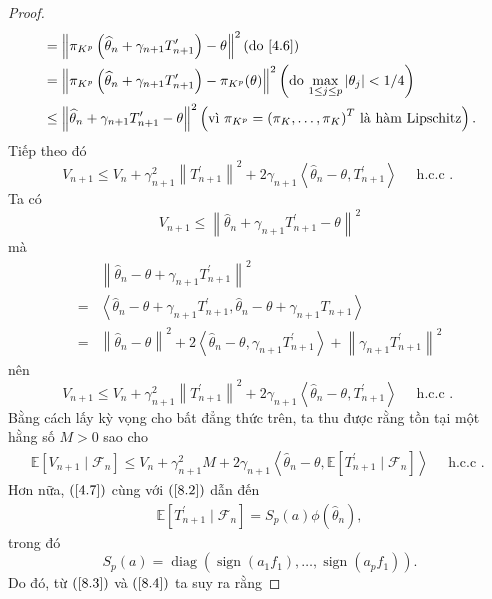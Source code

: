 \begin{proof}
$$\begin{aligned}
& =\left\|\pi_{K^{p}}\left(\widehat{\theta}_{n}+\gamma_{n+1} T_{n+1}^{\prime}\right)-\theta\right\|^{2} {\left(\text{do \ref{4.6}}\right)}\\
& =\left\|\pi_{K^{p}}\left(\widehat{\theta}_{n}+\gamma_{n+1} T_{n+1}^{\prime}\right)-\pi_{K^{p}}(\theta)\right\|^{2} {\left(\text{do $\max _{1 \leq j \leq p}\left|\theta_{j}\right|<1 / 4$}\right)}\\
& \leq\left\|\widehat{\theta}_{n}+\gamma_{n+1} T_{n+1}^{\prime}-\theta\right\|^{2} {\left(\text{vì $\pi_{K^{p}}=\left(\pi_{K}, \ldots, \pi_{K}\right)^{T}$ là hàm Lipschitz}\right).}
\end{aligned}
$$
Tiếp theo đó
$$
V_{n+1} \leq V_{n}+\gamma_{n+1}^{2}\left\|T_{n+1}^{\prime}\right\|^{2}+2 \gamma_{n+1}\left\langle\widehat{\theta}_{n}-\theta, T_{n+1}^{\prime}\right\rangle\quad \text { h.c.c . }
$$
Ta có
$$
V_{n+1} \leq\left\|\widehat{\theta}_{n}+\gamma_{n+1} T_{n+1}^{\prime}-\theta\right\|^{2}
$$
mà 
$$
\begin{aligned}
      &\left\|\hat{\theta}_n-\theta + \gamma_{n+1} T_{n+1}^{\prime}\right\|^2 \\
    = &\left\langle\hat{\theta}_n-\theta+\gamma_{n+1} T_{n+1}^{\prime}, \hat{\theta}_n-\theta+\gamma_{n+1} T_{n+1}\right\rangle \\
    = &\left\|\hat{\theta}_n-\theta\right\|^2+2\left\langle\hat{\theta}_n-\theta, \gamma_{n+1} T_{n+1}^{\prime}\right\rangle +\left\|\gamma_{n+1} T_{n+1}^{\prime}\right\|^2
\end{aligned}
$$
nên 
$$
V_{n+1} \leq V_{n}+\gamma_{n+1}^{2}\left\|T_{n+1}^{\prime}\right\|^{2}+2 \gamma_{n+1}\left\langle\widehat{\theta}_{n}-\theta, T_{n+1}^{\prime}\right\rangle\quad \text { h.c.c . }
$$
Bằng cách lấy kỳ vọng cho bất đẳng thức trên, ta thu được rằng tồn tại một hằng số $M>0$ sao cho
\begin{align}
    \mathbb{E}\left[V_{n+1} \mid \mathcal{F}_{n}\right] \leq V_{n}+\gamma_{n+1}^{2} M+2 \gamma_{n+1}\left\langle\widehat{\theta}_{n}-\theta, \mathbb{E}\left[T_{n+1}^{\prime} \mid \mathcal{F}_{n}\right]\right\rangle\quad \text { h.c.c . }
    \label{8.3}
\end{align}
Hơn nữa, $\left(\text{\ref{4.7}}\right)$ cùng với $\left(\text{\ref{8.2}}\right)$ dẫn đến
\begin{align}
\mathbb{E}\left[T_{n+1}^{\prime} \mid \mathcal{F}_{n}\right]=S_{p}(a) \phi\left(\widehat{\theta}_{n}\right),
\label{8.4}    
\end{align}
trong đó
$$
S_{p}(a)=\operatorname{diag}\left(\operatorname{sign}\left(a_{1} f_{1}\right), \ldots, \operatorname{sign}\left(a_{p} f_{1}\right)\right).
$$
Do đó, từ $\left(\text{\ref{8.3}}\right)$ và $\left(\text{\ref{8.4}}\right)$ ta suy ra rằng

\end{proof}
